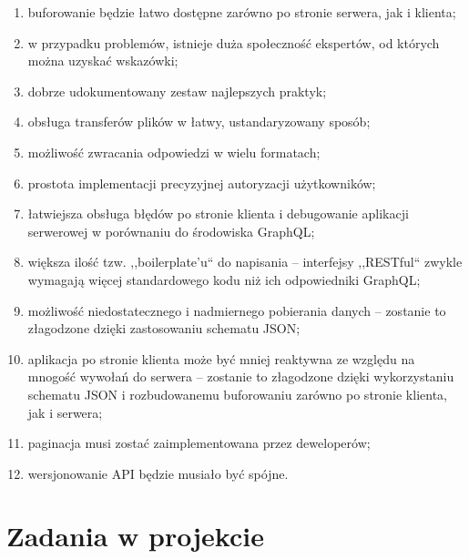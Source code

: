 \documentclass[12pt, a4paper, twoside, openany]{book}
\begin{document}
{\begin{enumerate}[label=--]
    \item buforowanie będzie łatwo dostępne zarówno po stronie serwera, jak i klienta;
    \item w przypadku problemów, istnieje duża społeczność ekspertów, od których można uzyskać wskazówki;
    \item dobrze udokumentowany zestaw najlepszych praktyk;
    \item obsługa transferów plików w łatwy, ustandaryzowany sposób;
    \item możliwość zwracania odpowiedzi w wielu formatach;
    \item prostota implementacji precyzyjnej autoryzacji użytkowników;
    \item łatwiejsza obsługa błędów po stronie klienta i debugowanie aplikacji serwerowej w porównaniu do środowiska GraphQL;
    \item większa ilość tzw. ,,boilerplate'u`` do napisania -- interfejsy ,,RESTful`` zwykle wymagają więcej standardowego kodu niż ich odpowiedniki GraphQL;
    \item możliwość niedostatecznego i nadmiernego pobierania danych -- zostanie to złagodzone dzięki zastosowaniu schematu JSON;
    \item aplikacja po stronie klienta może być mniej reaktywna ze względu na mnogość wywołań do serwera -- zostanie to złagodzone dzięki wykorzystaniu schematu JSON i rozbudowanemu buforowaniu zarówno po stronie klienta, jak i serwera;
    \item paginacja musi zostać zaimplementowana przez deweloperów;
    \item wersjonowanie API będzie musiało być spójne.
\end{enumerate}

\newpage
\section{Zadania w projekcie}

}
\end{document}
